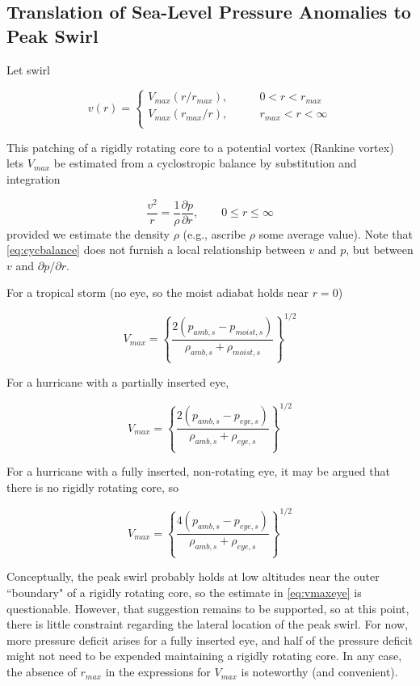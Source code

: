 \documentclass[preprint, prX]{revtex4}
\newcommand{\cbfrac}[2]{\left\{\frac{#1}{#2}\right\}}
\newcommand{\pd}[2]{\frac{\partial#1}{\partial#2}}
\newcommand{\vpd}[2]{\partial#1 / \partial#2}
\begin{document}
\subsection{Translation of Sea-Level Pressure Anomalies to Peak Swirl}


Let swirl 

\begin{equation}
v(r) = 
\begin{cases} 
      V_{max}(r/r_{max}), \qquad & 0 < r < r_{max} \\
      V_{max}(r_{max}/r),\qquad & r_{max} < r < \infty \\
   \end{cases}
\end{equation}

This patching of a rigidly rotating core to a potential vortex (Rankine vortex) lets $V_{max}$ be estimated from a cyclostropic balance by substitution and integration

\begin{equation}
	\frac{v^2}{r} = \frac{1}{\rho} \pd{p}{r}, \qquad 0 \le r \le \infty
	\label{eq:cycbalance}
\end{equation}
provided we estimate the density $\rho$ (e.g., ascribe $\rho$ some average value). Note that \eqref{eq:cycbalance} does not furnish a local relationship between $v$ and $p$, but between $v$ and $\vpd{p}{r}$.

For a tropical storm (no eye, so the moist adiabat holds near $r=0$)

\begin{equation}
	V_{max} = \cbfrac{ 2 ( p_{amb,s} - p_{moist,s})}{ \rho_{amb,s} + \rho_{moist,s} }^{1/2}
\end{equation}

For a hurricane with a partially inserted eye,

\begin{equation}
	V_{max} = \cbfrac{ 2 ( p_{amb,s} - p_{eye,s})}{ \rho_{amb,s} + \rho_{eye,s} }^{1/2}
\end{equation}

For a hurricane with a fully inserted, non-rotating eye, it may be argued that there is no rigidly rotating core, so

\begin{equation}
	V_{max} = \cbfrac{ 4 ( p_{amb,s} - p_{eye,s})}{ \rho_{amb,s} + \rho_{eye,s} }^{1/2}
	\label{eq:vmaxeye}
\end{equation}

Conceptually, the peak swirl probably holds at low altitudes near the outer ``boundary" of a rigidly rotating core, so the estimate in \eqref{eq:vmaxeye} is questionable. However, that suggestion remains to be supported, so at this point, there is little constraint regarding the lateral location of the peak swirl. For now, more pressure deficit arises for a fully inserted eye, and half of the pressure deficit might not need to be expended maintaining a rigidly rotating core. In any case, the absence of $r_{max}$ in the expressions for $V_{max}$ is noteworthy (and convenient).
\end{document}
